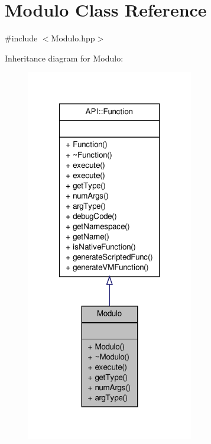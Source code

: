 \hypertarget{class_modulo}{\section{Modulo Class Reference}
\label{class_modulo}
}


{\ttfamily \#include $<$Modulo.\-hpp$>$}



Inheritance diagram for Modulo\-:
\nopagebreak
\begin{figure}[H]
\begin{center}
\leavevmode
\includegraphics[width=206pt]{class_modulo__inherit__graph}
\end{center}
\end{figure}


